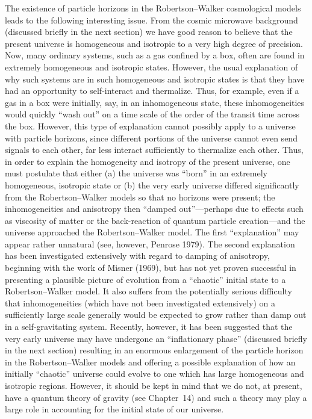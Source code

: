 The existence of particle horizons in the Robertson--Walker cosmological models
leads to the following interesting issue. From the cosmic microwave background
(discussed briefly in the next section) we have good reason to believe that the present
universe is homogeneous and isotropic to a very high degree of precision. Now, many
ordinary systems, such as a gas confined by a box, often are found in extremely
homogeneous and isotropic states. However, the usual explanation of why such systems
are in such homogeneous and isotropic states is that they have had an opportunity to
self-interact and thermalize. Thus, for example, even if a gas in a box were initially,
say, in an inhomogeneous state, these inhomogeneities would quickly ``wash out'' on
a time scale of the order of the transit time across the box. However, this type of
explanation cannot possibly apply to a universe with particle horizons, since different
portions of the universe cannot even send signals to each other, far less interact
sufficiently to thermalize each other. Thus, in order to explain the homogeneity and
isotropy of the present universe, one must postulate that either (a) the universe was
``born'' in an extremely homogeneous, isotropic state or (b) the very early universe
differed significantly from the Robertson--Walker models so that no horizons were
present; the inhomogeneities and anisotropy then ``damped out''---perhaps due to
effects such as viscosity of matter or the back-reaction of quantum particle
creation---and the universe approached the Robertson--Walker model. The first
``explanation'' may appear rather unnatural (see, however, Penrose 1979). The second
explanation has been investigated extensively with regard to damping of anisotropy,
beginning with the work of Misner (1969), but has not yet proven successful in
presenting a plausible picture of evolution from a ``chaotic'' initial state to a
Robertson--Walker model. It also suffers from the potentially serious difficulty that
inhomogeneities (which have not been investigated extensively) on a sufficiently large
scale generally would be expected to grow rather than damp out in a self-gravitating
system. Recently, however, it has been suggested that the very early universe may have
undergone an ``inflationary phase'' (discussed briefly in the next section) resulting in
an enormous enlargement of the particle horizon in the Robertson--Walker models and
offering a possible explanation of how an initially ``chaotic'' universe could evolve to
one which has large homogeneous and isotropic regions. However, it should be kept in
mind that we do not, at present, have a quantum theory of gravity (see Chapter~14)
and such a theory may play a large role in accounting for the initial state of our
universe.
